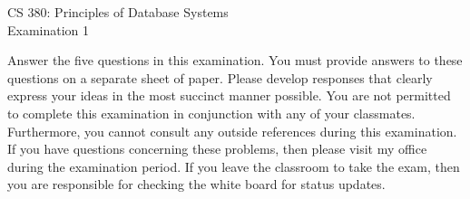 \documentclass[12pt]{article}
\def\widow#1{\vskip #1\vbadness10000\penalty-200\vskip-#1}
\begin{document}
\pagestyle{empty}

\def\widow#1{\vskip #1\vbadness10000\penalty-200\vskip-#1}

\begin{center}

CS 380: Principles of Database Systems \\
Examination 1 \\

\end{center}

\noindent
Answer the five questions in this examination.  You must provide
answers to these questions on a separate sheet of paper.  Please
develop responses that clearly express your ideas in the most succinct
manner possible.  You are not permitted to complete this examination
in conjunction with any of your classmates.  Furthermore, you cannot
consult any outside references during this examination.  If you have
questions concerning these problems, then please visit my office
during the examination period.  If you leave the classroom to take the
exam, then you are responsible for checking the white board for status
updates.

\newpage
\end{document}

